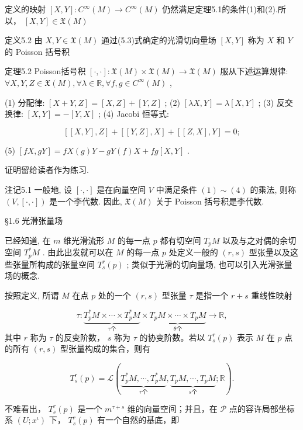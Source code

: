 定义的映射  $[X,Y]:C^{\infty}(M)\to C^{\infty}(M)$  仍然满足定理5.1的条件(1)和(2).所以，  $[X,Y]\in \mathfrak{X}(M)$

定义5.2 由  $X, Y \in \mathfrak{X}(M)$  通过(5.3)式确定的光滑切向量场  $[X, Y]$  称为  $X$  和  $Y$  的 Poisson 括号积

定理5.2 Poisson括号积  $[\cdot, \cdot]: \mathfrak{X}(M) \times \mathfrak{X}(M) \to \mathfrak{X}(M)$  服从下述运算规律:  $\forall X, Y, Z \in \mathfrak{X}(M), \forall \lambda \in \mathbb{R}, \forall f, g \in C^{\infty}(M)$ ,

(1) 分配律:  $[X + Y, Z] = [X, Z] + [Y, Z]$ ;  
(2)  $[\lambda X, Y] = \lambda [X, Y]$ ;  
(3) 反交换律:  $[X, Y] = -[Y, X]$ ;  
(4) Jacobi 恒等式:

$$
[ [ X, Y ], Z ] + [ [ Y, Z ], X ] + [ [ Z, X ], Y ] = 0;
$$

(5)  $[fX, gY] = fX(g)Y - gY(f)X + fg[X,Y]$ .

证明留给读者作为练习.

注记5.1 一般地, 设  $[\cdot, \cdot]$  是在向量空间  $V$  中满足条件  $(1) \sim (4)$  的乘法, 则称  $(V, [\cdot, \cdot])$  是一个李代数. 因此,  $\mathfrak{X}(M)$  关于 Poisson 括号积是李代数.

 §1.6 光滑张量场

已经知道, 在  $m$  维光滑流形  $M$  的每一点  $p$  都有切空间  $T_{p}M$  以及与之对偶的余切空间  $T_{p}^{*}M$ . 由此出发就可以在  $M$  的每一点  $p$  处定义一般的  $(r, s)$  型张量以及这些张量所构成的张量空间  $T_{s}^{r}(p)$ ; 类似于光滑的切向量场, 也可以引入光滑张量场的概念.

按照定义, 所谓  $M$  在点  $p$  处的一个  $(r,s)$  型张量  $\tau$  是指一个  $r + s$  重线性映射

$$
\tau : \underbrace {T _ {p} ^ {*} M \times \cdots \times T _ {p} ^ {*} M} _ {\tau \text {个}} \times \underbrace {T _ {p} M \times \cdots \times T _ {p} M} _ {\theta \text {个}} \to \mathbb {R},
$$
其中  $r$  称为  $\tau$  的反变阶数， $s$  称为  $\tau$  的协变阶数。若以  $T_{s}^{r}(p)$  表示  $M$  在  $p$  点的所有  $(r, s)$  型张量构成的集合，则有

$$
T _ {s} ^ {r} (p) = \mathcal {L} (\underbrace {T _ {p} ^ {*} M , \cdots , T _ {p} ^ {*} M} _ {r \text {个}}, \underbrace {T _ {p} M , \cdots , T _ {p} M} _ {s \text {个}}; \mathbb {R}).
$$

不难看出，  $T_{s}^{r}(p)$  是一个  $m^{\tau + s}$  维的向量空间；并且，在  $\mathcal{P}$  点的容许局部坐标系  $(U; x^{\iota})$  下，  $T_{s}^{r}(p)$  有一个自然的基底，即

